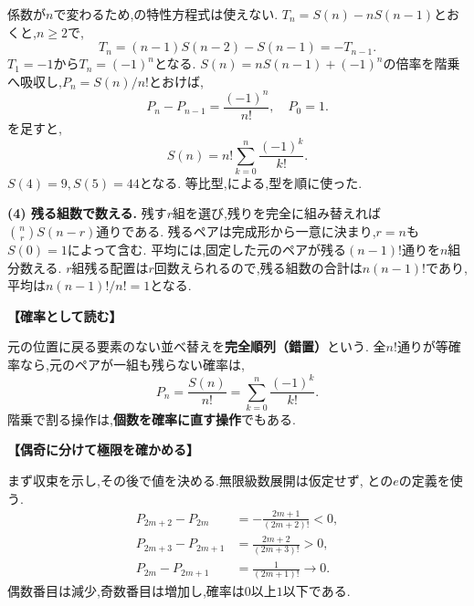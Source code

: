 \begin{enumerate}[label=\textbf{問\arabic*.},leftmargin=3.8em,format=\bookitemlink{practice-entrance}{solution}{problem}]
                  係数が$n$で変わるため,の特性方程式は使えない.
                  $T_n=S(n)-nS(n-1)$とおくと,$n\ge2$で,
                  \[
                    T_n=(n-1)S(n-2)-S(n-1)=-T_{n-1}.
                  \]
                  $T_1=-1$から$T_n=(-1)^n$となる.
                  $S(n)=nS(n-1)+(-1)^n$の倍率を階乗へ吸収し,$P_n=S(n)/n!$とおけば,
                  \[
                    P_n-P_{n-1}=\frac{(-1)^n}{n!},\quad P_0=1.
                  \]
                  を足すと,
                  \[
                    S(n)=n!\sum_{k=0}^n\frac{(-1)^k}{k!}.
                  \]
                  $S(4)=9,S(5)=44$となる.
                  等比型,による,型を順に使った.
                  \par\smallskip\textbf{(4) 残る組数で数える.}
                  残す$r$組を選び,残りを完全に組み替えれば$\binom nrS(n-r)$通りである.
                  残るペアは完成形から一意に決まり,$r=n$も$S(0)=1$によって含む.
                  平均には,固定した元のペアが残る$(n-1)!$通りを$n$組分数える.
                  $r$組残る配置は$r$回数えられるので,残る組数の合計は$n(n-1)!$であり,平均は$n(n-1)!/n!=1$となる.
                  \par\smallskip\noindent\textbf{【確率として読む】}\par\nopagebreak[4]
                  元の位置に戻る要素のない並べ替えを\textbf{完全順列（錯置）}という.
                  全$n!$通りが等確率なら,元のペアが一組も残らない確率は,
                  \[
                    P_n=\frac{S(n)}{n!}=\sum_{k=0}^n\frac{(-1)^k}{k!}.
                  \]
                  階乗で割る操作は,\textbf{個数を確率に直す操作}でもある.
                  \par\smallskip\noindent\textbf{【偶奇に分けて極限を確かめる】}\par\nopagebreak[4]
                  まず収束を示し,その後で値を決める.無限級数展開は仮定せず,
                  との$e$の定義を使う.
                  \[
                  \begin{aligned}
                    P_{2m+2}-P_{2m}&=-\frac{2m+1}{(2m+2)!}<0,\\
                    P_{2m+3}-P_{2m+1}&=\frac{2m+2}{(2m+3)!}>0,\\
                    P_{2m}-P_{2m+1}&=\frac1{(2m+1)!}\longrightarrow0.
                  \end{aligned}
                  \]
                  偶数番目は減少,奇数番目は増加し,確率は$0$以上$1$以下である.

\end{enumerate}
